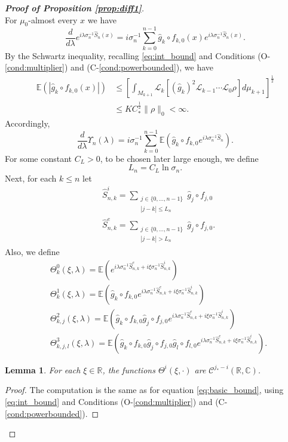 \documentclass{amsart}
\numberwithin{equation}{section}
\newtheorem{lem}[thm]{Lemma}
\newcommand\cC{{\mathcal C}}
\newcommand\cL{{\mathcal L}}
\newcommand\bC{{\mathbb C}}
\newcommand\bE{{\mathbb E}}
\newcommand\bR{{\mathbb R}}
\newcommand{\hS}{\hat{S}}
\begin{document}
\begin{proof}[\bf \em Proof of Proposition \ref{prop:diff1}]\ \\
For $\mu_0$-almost every $x$ we have
\[
\frac{d}{d\lambda}e^{i\lambda \sigma_n^{-1} \hS_n(x)}=i\sigma_n^{-1}\sum_{k=0}^{n-1}\hat g_k\circ f_{k,0}(x)e^{i\lambda \sigma_n^{-1} \hS_n(x)}.
\]
By the Schwartz inequality, recalling \eqref{eq:int_bound}  and Conditions (O-\ref{cond:multiplier}) and (C-\ref{cond:powerbounded}), we have
\begin{equation}\label{eq:basic_bound}
\begin{split}
\bE(|\hat g_k\circ f_{k,0}(x)|)&\leq \left[\int_{M_{k+1}}\cL_k\left[(\hat g_k)^2\cL_{k-1}\cdots\cL_0\rho \right] d\mu_{k+1}\right]^{\frac 12}\\
&\leq K C_*^\frac 12 \|\rho\|_0<\infty.
\end{split}
\end{equation}
Accordingly,
\begin{equation}\label{eq:step1}
\frac{d}{d\lambda}\Upsilon_n(\lambda)=i\sigma_n^{-1}\sum_{k=0}^{n-1}\bE\left(\hat g_k\circ f_{k,0}e^{i\lambda \sigma_n^{-1} \hS_n}\right).
\end{equation}
For some constant $C_L>0$, to be chosen later large enough, we define
\begin{equation}\label{eq:Ln}
L_n=C_L\ln\sigma_n.
\end{equation}
 Next, for each $k\leq n$ let
 \[
 \begin{split}
&\hS^i_{n,k}=\sum_{\substack{ j\in\{0,\dots, n-1\}\\ |j-k|\leq L_n}} \hat g_j\circ f_{j,0}\\
&\hS^e_{n,k}=\sum_{\substack{ j\in\{0,\dots, n-1\}\\ |j-k|>  L_n}} \hat g_j\circ f_{j,0}.
 \end{split}
 \]
Also, we define
 \[
 \begin{split}
& \Theta^0_k(\xi,\lambda)=\bE\left(e^{i\lambda \sigma_n^{-1}\hS^e_{n,k}+i\xi\sigma_n^{-1}\hS^i_{n,k} }\right)\\
& \Theta^1_{k}(\xi,\lambda)=\bE\left(\hat g_k\circ f_{k,0}e^{i\lambda \sigma_n^{-1}\hS^e_{n,k}+i\xi\sigma_n^{-1}\hS^i_{n,k} }\right)\\
& \Theta^2_{k,j}(\xi,\lambda)=\bE\left(\hat g_k\circ f_{k,0}\hat g_j\circ f_{j,0}e^{i\lambda \sigma_n^{-1}\hS^e_{n,k}+i\xi\sigma_n^{-1} \hS^i_{n,k} }\right)\\
& \Theta^3_{k,j,l}(\xi,\lambda)=\bE\left(\hat g_k\circ f_{k,0}\hat g_j\circ f_{j,0}\hat g_l\circ f_{l,0}e^{i\lambda \sigma_n^{-1}\hS^e_{n,k}+i\xi\sigma_n^{-1} \hS^i_{n,k} }\right).
\end{split}
\]
\begin{lem}\label{lem:taylor}
For each $\xi\in\bR$, the functions $\Theta^i(\xi,\cdot)$ are $\cC^{j_*-i}(\bR,\bC)$. 
\end{lem}
\begin{proof}
The computation is the same as for equation \eqref{eq:basic_bound}, using   \eqref{eq:int_bound}  and Conditions (O-\ref{cond:multiplier}) and (C-\ref{cond:powerbounded}).
\end{proof}


\end{proof}
\end{document}
